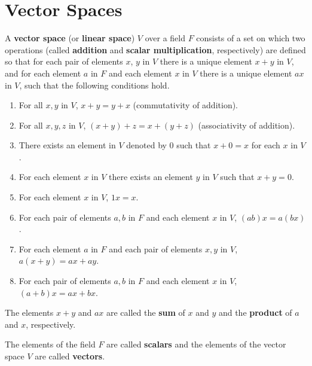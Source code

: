 \section{Vector Spaces}\label{sec:1.2}

\begin{definition}\label{def:1.2.1}
    A \textbf{vector space} (or \textbf{linear space}) $V$ over a field $F$ consists of a set on which two operations (called \textbf{addition} and \textbf{scalar multiplication}, respectively) are deﬁned so that for each pair of elements $x$, $y$ in $V$ there is a unique element $x + y$ in $V$, and for each element $a$ in $F$ and each element $x$ in $V$ there is a unique element $ax$ in $V$, such that the following conditions hold.
    \begin{enumerate}[label=(VS \arabic*), ref=VS \arabic*]
        \item \label{1.2.1.1}
              For all $x, y$ in $V$, $x + y = y + x$
              (commutativity of addition).
        \item \label{1.2.1.2}
              For all $x, y, z$ in $V$, $(x + y) + z = x + (y + z)$
              (associativity of addition).
        \item \label{1.2.1.3}
              There exists an element in $V$ denoted by $0$ such that $x + 0 = x$ for each $x$ in $V$.
        \item \label{1.2.1.4}
              For each element $x$ in $V$ there exists an element $y$ in $V$ such that $x + y = 0$.
        \item \label{1.2.1.5}
              For each element $x$ in $V$, $1x = x$.
        \item \label{1.2.1.6}
              For each pair of elements $a, b$ in $F$ and each element $x$ in $V$, $(ab)x = a(bx)$.
        \item \label{1.2.1.7}
              For each element $a$ in $F$ and each pair of elements $x, y$ in $V$, $a(x + y) = ax + ay$.
        \item \label{1.2.1.8}
              For each pair of elements $a, b$ in $F$ and each element $x$ in $V$, $(a + b)x = ax + bx$.
    \end{enumerate}
    The elements $x + y$ and $ax$ are called the \textbf{sum} of $x$ and $y$ and the \textbf{product} of $a$ and $x$, respectively.
\end{definition}

\begin{definition}\label{def:1.2.2}
    The elements of the field $F$ are called \textbf{scalars} and the elements of the vector space $V$ are called \textbf{vectors}.
\end{definition}

